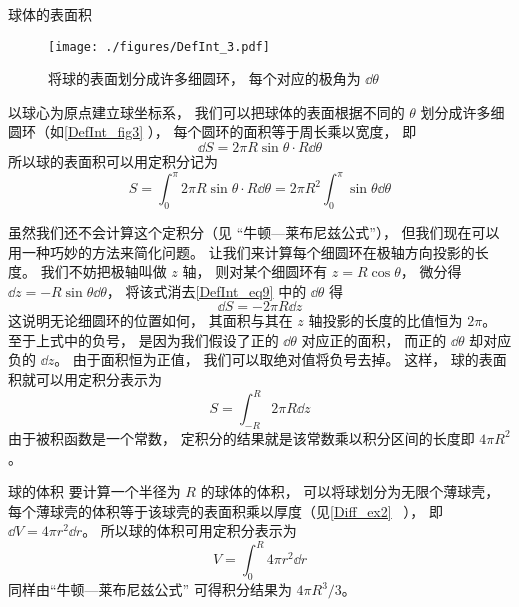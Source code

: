 \begin{example}{球体的表面积}\label{DefInt_ex3}

\begin{figure}[ht]
\centering
\texttt{[image: ./figures/DefInt\_3.pdf]}
\caption{将球的表面划分成许多细圆环， 每个对应的极角为 $\dd{\theta}$} \label{DefInt_fig3}
\end{figure}

以球心为原点建立球坐标系， 我们可以把球体的表面根据不同的 $\theta$ 划分成许多细圆环（如\autoref{DefInt_fig3} ）， 每个圆环的面积等于周长乘以宽度， 即
\begin{equation}\label{DefInt_eq9}
\dd{S} = 2\pi R\sin\theta \cdot R\dd{\theta}
\end{equation}
所以球的表面积可以用定积分记为
\begin{equation}
S = \int_0^{\pi} 2\pi R\sin\theta \cdot R\dd{\theta} = 2\pi R^2 \int_0^{\pi} \sin\theta \dd{\theta}
\end{equation}

虽然我们还不会计算这个定积分（见 “牛顿—莱布尼兹公式”）， 但我们现在可以用一种巧妙的方法来简化问题。 让我们来计算每个细圆环在极轴方向投影的长度。 我们不妨把极轴叫做 $z$ 轴， 则对某个细圆环有 $z = R\cos\theta$， 微分得 $\dd{z} = -R\sin\theta \dd{\theta}$， 将该式消去\autoref{DefInt_eq9} 中的 $\dd{\theta}$ 得
\begin{equation}
\dd{S} = -2\pi R\dd{z}
\end{equation}
这说明无论细圆环的位置如何， 其面积与其在 $z$ 轴投影的长度的比值恒为 $2\pi$。 至于上式中的负号， 是因为我们假设了正的 $\dd{\theta}$ 对应正的面积， 而正的 $\dd{\theta}$ 却对应负的 $\dd{z}$。 由于面积恒为正值， 我们可以取绝对值将负号去掉。 这样， 球的表面积就可以用定积分表示为
\begin{equation}\label{DefInt_eq12}
S = \int_{-R}^{R} 2\pi R\dd{z}
\end{equation}
由于被积函数是一个常数， 定积分的结果就是该常数乘以积分区间的长度即 $4\pi R^2$。
\end{example}

\begin{example}{球的体积}\label{DefInt_ex4}
要计算一个半径为 $R$ 的球体的体积， 可以将球划分为无限个薄球壳， 每个薄球壳的体积等于该球壳的表面积乘以厚度（见\autoref{Diff_ex2}~ ）， 即 $\dd{V} = 4\pi r^2 \dd{r}$。 所以球的体积可用定积分表示为
\begin{equation}
V = \int_0^R 4\pi r^2 \dd{r}
\end{equation}
同样由“牛顿—莱布尼兹公式” 可得积分结果为 $4\pi R^3/3$。
\end{example}

